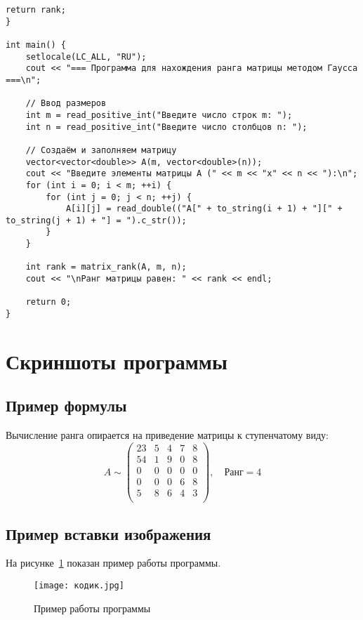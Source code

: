 \documentclass[a4paper,12pt]{article}
\begin{document}
\begin{lstlisting}[style=mystyle, caption=Программа для вычисления ранга матрицы методом Гаусса, label=lst:matrix_rank]
    return rank;
}

int main() {
    setlocale(LC_ALL, "RU");
    cout << "=== Программа для нахождения ранга матрицы методом Гаусса ===\n";

    // Ввод размеров
    int m = read_positive_int("Введите число строк m: ");
    int n = read_positive_int("Введите число столбцов n: ");

    // Создаём и заполняем матрицу
    vector<vector<double>> A(m, vector<double>(n));
    cout << "Введите элементы матрицы A (" << m << "x" << n << "):\n";
    for (int i = 0; i < m; ++i) {
        for (int j = 0; j < n; ++j) {
            A[i][j] = read_double(("A[" + to_string(i + 1) + "][" + to_string(j + 1) + "] = ").c_str());
        }
    }

    int rank = matrix_rank(A, m, n);
    cout << "\nРанг матрицы равен: " << rank << endl;

    return 0;
}
\end{lstlisting}

\section{Скриншоты программы}
\label{sec:program-shots}
\subsection{Пример формулы}
\label{sec:mathexample}

Вычисление ранга опирается на приведение матрицы к ступенчатому виду:
\[
A \sim \begin{pmatrix}
23 & 5 & 4 & 7 & 8 \\
54 & 1 & 9 &0 &8 \\
0  & 0 & 0 & 0& 0\\
0 & 0 & 0 & 6 & 8 \\
5 & 8 & 6 & 4 & 3 \\

\end{pmatrix}, \quad \text{Ранг} = 4
\]

\subsection{Пример вставки изображения}
\label{sec:picexample}

На рисунке~\ref{fig:screenshot} показан пример работы программы.

\begin{figure}[h]
  \centering
  \texttt{[image: кодик.jpg]}
  \caption{Пример работы программы}\label{fig:screenshot}
\end{figure}
\end{document}
